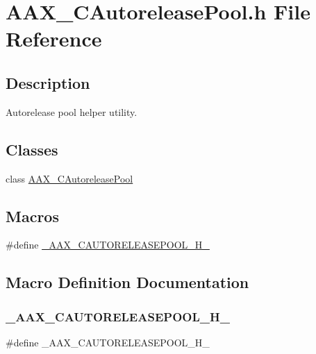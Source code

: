 \hypertarget{a00407}{}\section{A\+A\+X\+\_\+\+C\+Autorelease\+Pool.\+h File Reference}
\label{a00407}


\subsection{Description}
Autorelease pool helper utility. 

\subsection*{Classes}
\begin{DoxyCompactItemize}
\item 
class \mbox{\hyperlink{a01445}{A\+A\+X\+\_\+\+C\+Autorelease\+Pool}}
\end{DoxyCompactItemize}
\subsection*{Macros}
\begin{DoxyCompactItemize}
\item 
\#define \mbox{\hyperlink{a00407_ab8081ca091051bda29f018e9cc578a5a}{\+\_\+\+A\+A\+X\+\_\+\+C\+A\+U\+T\+O\+R\+E\+L\+E\+A\+S\+E\+P\+O\+O\+L\+\_\+\+H\+\_\+}}
\end{DoxyCompactItemize}


\subsection{Macro Definition Documentation}
\mbox{\label{a00407_ab8081ca091051bda29f018e9cc578a5a}} 
\subsubsection{\texorpdfstring{\_AAX\_CAUTORELEASEPOOL\_H\_}{\_AAX\_CAUTORELEASEPOOL\_H\_}}
{\footnotesize\ttfamily \#define \+\_\+\+A\+A\+X\+\_\+\+C\+A\+U\+T\+O\+R\+E\+L\+E\+A\+S\+E\+P\+O\+O\+L\+\_\+\+H\+\_\+}

